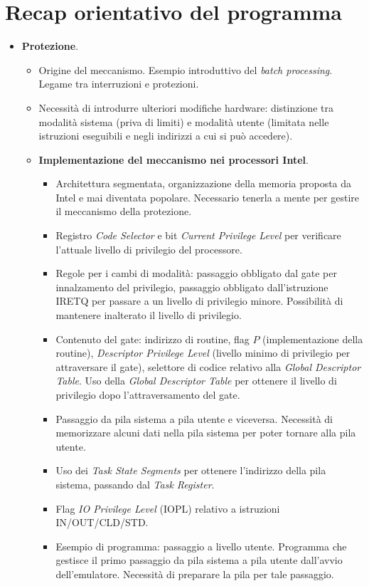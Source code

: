 \chapter{Recap orientativo del programma}
\begin{itemize}
	\item \textbf{Protezione}.
	\begin{itemize}
		\item Origine del meccanismo. Esempio introduttivo del \emph{batch processing}. Legame tra interruzioni e protezioni.
		\item Necessità di introdurre ulteriori modifiche hardware: distinzione tra modalità sistema (priva di limiti) e modalità utente (limitata nelle istruzioni eseguibili e negli indirizzi a cui si può accedere).
		\item \textbf{Implementazione del meccanismo nei processori Intel}.
		\begin{itemize}
			\item Architettura segmentata, organizzazione della memoria proposta da Intel e mai diventata popolare. Necessario tenerla a mente per gestire il meccanismo della protezione.
			\item Registro \emph{Code  Selector} e bit \emph{Current Privilege Level} per verificare l'attuale livello di privilegio del processore.
			\item Regole per i cambi di modalità: passaggio obbligato dal gate per innalzamento del privilegio, passaggio obbligato dall'istruzione IRETQ per passare a un livello di privilegio minore. Possibilità di mantenere inalterato il livello di privilegio.
			\item Contenuto del gate: indirizzo di routine, flag $P$ (implementazione della routine), \emph{Descriptor Privilege Level} (livello minimo di privilegio per attraversare il gate), selettore di codice relativo alla \emph{Global Descriptor Table}. Uso della \emph{Global Descriptor Table} per ottenere il livello di privilegio dopo l'attraversamento del gate.
			\item Passaggio da pila sistema a pila utente e viceversa. Necessità di memorizzare alcuni dati nella pila sistema per poter tornare alla pila utente.
			\item Uso dei \emph{Task State Segments} per ottenere l'indirizzo della pila sistema, passando dal \emph{Task Register}.
			\item Flag \emph{IO Privilege Level} (IOPL) relativo a istruzioni  IN/OUT/CLD/STD.
			\item Esempio di programma: passaggio a livello utente. Programma che gestisce il primo passaggio da pila sistema a pila utente dall'avvio dell'emulatore. Necessità di preparare la pila per tale passaggio.

\end{itemize}
\end{itemize}
\end{itemize}
